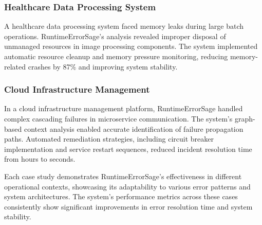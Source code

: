 \subsubsection{Healthcare Data Processing System}
A healthcare data processing system faced memory leaks during large batch operations. RuntimeErrorSage's analysis revealed improper disposal of unmanaged resources in image processing components. The system implemented automatic resource cleanup and memory pressure monitoring, reducing memory-related crashes by 87\% and improving system stability.

\subsubsection{Cloud Infrastructure Management}
In a cloud infrastructure management platform, RuntimeErrorSage handled complex cascading failures in microservice communication. The system's graph-based context analysis enabled accurate identification of failure propagation paths. Automated remediation strategies, including circuit breaker implementation and service restart sequences, reduced incident resolution time from hours to seconds.

Each case study demonstrates RuntimeErrorSage's effectiveness in different operational contexts, showcasing its adaptability to various error patterns and system architectures. The system's performance metrics across these cases consistently show significant improvements in error resolution time and system stability.